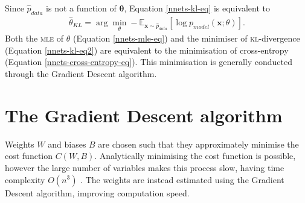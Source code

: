Since $\hat{p}_{data}$ is not a function of $\mathbf{\theta}$, Equation \eqref{nnets-kl-eq} is equivalent to 
\begin{align}\label{nnets-kl-eq2}
	\hat\theta_{KL} = \arg\min_\theta-\mathbb{E}_{\mathbf{x}\sim\hat{p}_{data}}\left[\log p_{model}(\mathbf{x};\theta)\right].
\end{align}
Both the \textsc{mle} of $\theta$ (Equation \eqref{nnets-mle-eq}) and the minimiser of \textsc{kl}-divergence (Equation \eqref{nnets-kl-eq2}) are equivalent to the minimisation of cross-entropy (Equation \eqref{nnets-cross-entropy-eq}). This minimisation is generally conducted through the Gradient Descent algorithm.






\section{The Gradient Descent algorithm}\label{nnets-graddesc}

Weights $W$ and biases $B$ are chosen such that they approximately minimise the cost function $C(W,B)$. Analytically minimising the cost function is possible, however the large number of variables makes this process slow, having time complexity $O(n^3)$ \citep{Marquardt1963}. The weights are instead estimated using the Gradient Descent algorithm, improving computation speed.


